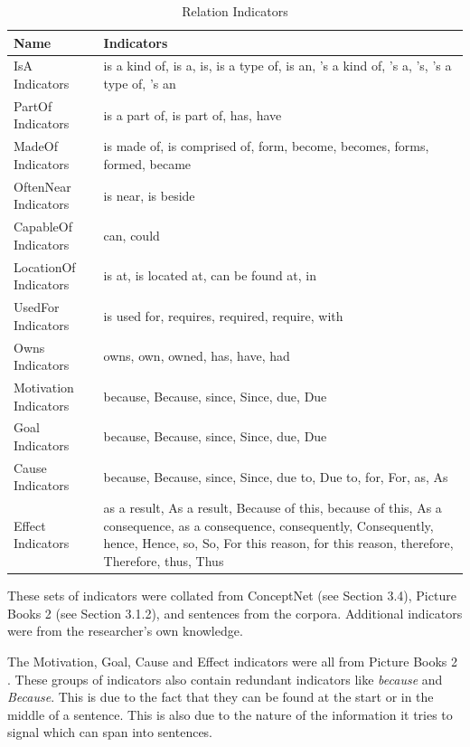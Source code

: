 \begin{table}[H]   %
\centering
\caption{Relation Indicators} \vspace{0.25em}
\begin{tabular}{|p{3.5cm}|p{10cm}|} \hline
\textbf{Name} & \textbf{Indicators} \\ \hline
IsA Indicators				& is a kind of, is a, is, is a type of, is an, 's a kind of, 's a, 's, 's a type of, 's an \\ \hline
PartOf Indicators			& is a part of, is part of, has, have \\ \hline
MadeOf Indicators			& is made of, is comprised of, form, become, becomes, forms, formed, became \\ \hline
OftenNear Indicators		& is near, is beside \\ \hline
CapableOf Indicators		& can, could \\ \hline
LocationOf Indicators		& is at, is located at, can be found at, in \\ \hline
UsedFor Indicators			& is used for, requires, required, require, with \\ \hline
Owns Indicators 			& owns, own, owned, has, have, had \\ \hline
Motivation Indicators		& because, Because, since, Since, due, Due \\ \hline
Goal Indicators				& because, Because, since, Since, due, Due \\ \hline
Cause Indicators			& because, Because, since, Since, due to, Due to, for, For, as, As \\ \hline
Effect Indicators			& as a result, As a result, Because of this, because of this, As a consequence, as a consequence, consequently, Consequently, hence, Hence, so, So, For this reason, for this reason, therefore, Therefore, thus, Thus \\ \hline
\end{tabular}
\label{tab:indicators}
\end{table}

These sets of indicators were collated from ConceptNet (see Section 3.4), Picture Books 2 \cite{Ang:2010} (see Section 3.1.2), and sentences from the corpora. Additional indicators were from the researcher's own knowledge.

The Motivation, Goal, Cause and Effect indicators were all from Picture Books 2 \cite{Ang:2010}. These groups of indicators also contain redundant indicators like \textit{because} and \textit{Because}. This is due to the fact that they can be found at the start or in the middle of a sentence. This is also due to the nature of the information it tries to signal which can span into sentences.

